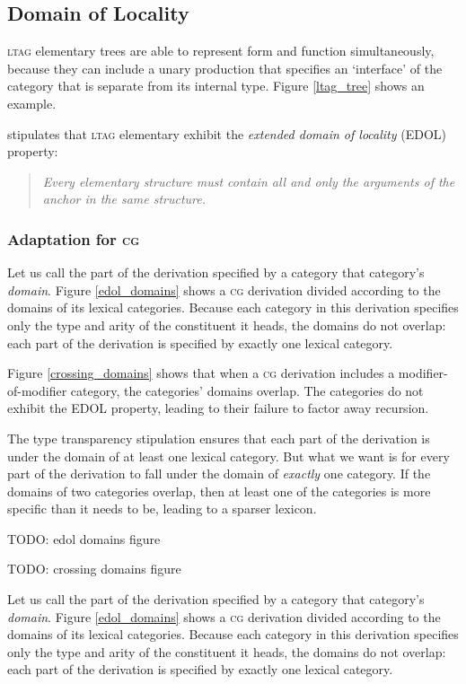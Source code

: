 \documentclass[11pt,twoside,final]{ahudson-harvard}
\newcommand{\ltag}{\textsc{ltag}\xspace}
\newcommand{\cg}{\textsc{cg}\xspace}
\newcommand{\term}[1]{\emph{#1}}
\begin{document}
\subsection{Domain of Locality}

\ltag elementary trees are able to represent form and function simultaneously, because they can include a unary production that specifies an `interface' of the category that is separate from its internal type. Figure \ref{ltag_tree} shows an example.

\citet{ltag} stipulates that \ltag elementary exhibit the \term{extended domain of locality} (EDOL) property:

\begin{quote}
\emph{Every elementary structure must contain all and only the arguments of the anchor in the same structure.}
\end{quote}

\subsubsection{Adaptation for \cg}

Let us call the part of the derivation specified by a category that category's \term{domain}. Figure \ref{edol_domains} shows a \cg derivation divided according to the domains of its lexical categories. Because each category in this derivation specifies only the type and arity of the constituent it heads, the domains do not overlap: each part of the derivation is specified by exactly one lexical category.

Figure \ref{crossing_domains} shows that when a \cg derivation includes a modifier-of-modifier category, the categories' domains overlap. The categories do not exhibit the EDOL property, leading to their failure to factor away recursion.

The type transparency stipulation ensures that each part of the derivation is under the domain of at least one lexical category. But what we want is for every part of the derivation to fall under the domain of \emph{exactly} one category. If the domains of two categories overlap, then at least one of the categories is more specific than it needs to be, leading to a sparser lexicon.

TODO: edol domains figure

TODO: crossing domains figure

Let us call the part of the derivation specified by a category that category's \term{domain}. Figure \ref{edol_domains} shows a \cg derivation divided according to the domains of its lexical categories. Because each category in this derivation specifies only the type and arity of the constituent it heads, the domains do not overlap: each part of the derivation is specified by exactly one lexical category.
\end{document}
